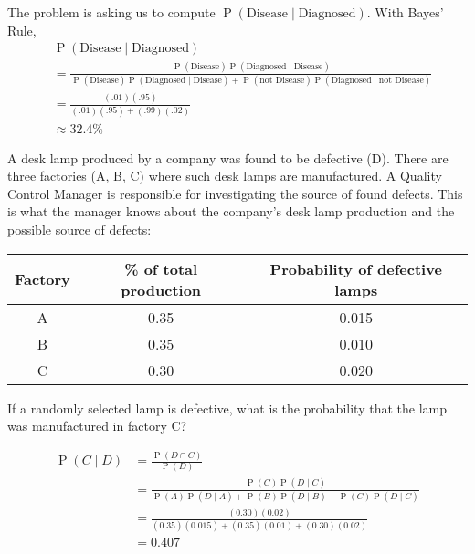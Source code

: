\documentclass[answers,11pt]{exam}
\DeclareMathOperator*{\Prob}{P}
\renewcommand{\Pr}{\Prob}
\begin{document}
\begin{questions}
\begin{solution}
The problem is asking us to compute $\Pr(\text{Disease}\mid \text{Diagnosed})$. With Bayes' Rule,
\begin{align*}
& \Pr(\text{Disease}\mid \text{Diagnosed}) \\
&= \frac{\Pr(\text{Disease})\Pr(\text{Diagnosed}\mid \text{Disease})}
{\Pr(\text{Disease})\Pr(\text{Diagnosed}\mid \text{Disease})
+ \Pr(\text{not Disease})\Pr(\text{Diagnosed}\mid \text{not Disease})}\\
&= \frac{(.01)(.95) }{(.01)(.95)+(.99)(.02)} \\
&\approx 32.4\%
\end{align*}
\end{solution}

\question A desk lamp produced by a company was found to be defective (D). There are three factories (A, B, C) where such desk lamps are manufactured. A Quality Control Manager is responsible for investigating the source of found defects. This is what the manager knows about the company's desk lamp production and the possible source of defects: 

\begin{center}
\begin{tabular}{|c|c|c|} \hline
Factory & \% of total production & Probability of defective lamps \\ \hline
A &  0.35 & 0.015 \\ \hline
B &  0.35 & 0.010 \\ \hline
C &  0.30 & 0.020\\ \hline
\end{tabular}
\end{center}

If a randomly selected lamp is defective, what is the probability that the lamp was manufactured in factory C?
\begin{solution}
\begin{align*}
\Pr(C \mid D) & = \frac{\Pr(D \cap C)}{\Pr(D)} \\
& = \frac{\Pr(C)\Pr(D \mid C)}
{\Pr(A)\Pr(D\mid A) + \Pr(B)\Pr(D\mid B) + \Pr(C)\Pr(D \mid C)}\\
&= \frac{(0.30)(0.02)}{(0.35)(0.015)+(0.35)(0.01)+(0.30)(0.02)} \\
&= 0.407
\end{align*}
\end{solution}


\newpage
{}


\end{questions}
\end{document}
